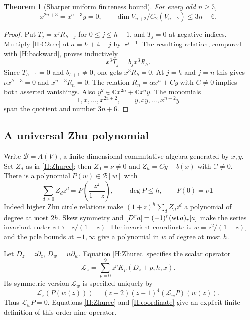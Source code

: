 \documentclass[11pt]{article}
\newtheorem{theorem}{Theorem}[section]
\newcommand{\C}{\mathbb C}\newcommand{\Q}{\mathbb Q}\newcommand{\Z}{\mathbb Z}
\newcommand{\one}{\mathbf1}\newcommand{\D}{\mathcal D}\newcommand{\Dcat}{\mathcal D}
\numberwithin{equation}{section}
\begin{document}
\begin{theorem}[Sharper uniform finiteness bound]\label{H:C2bound}
For every odd $n\geq3$,
\[
x^{2n+3}=x^{n+3}y=0,\qquad \dim V_{n+2}/C_2(V_{n+2})\leq3n+6.
\]
\end{theorem}
\begin{proof}
Put $T_j=x^jR_{h-j}$ for $0\leq j\leq h+1$, and $T_j=0$ at negative indices. Multiply \eqref{H:C2rec} at $a=h+4-j$ by $x^{j-1}$. The resulting relation, compared with \eqref{H:backward}, proves inductively
\[
x^3T_j=b_jx^3R_h.
\]
Since $T_{h+1}=0$ and $b_{h+1}\ne0$, one gets $x^3R_h=0$. At $j=h$ and $j=n$ this gives $\nu x^{h+3}=0$ and $x^{n+3}R_n=0$. The relation $R_n=\alpha x^n+Cy$ with $C\ne0$ implies both asserted vanishings. Also $y^2\in\C x^{2n}+\C x^ny$. The monomials
\[
1,x,\ldots,x^{2n+2},\qquad y,xy,\ldots,x^{n+2}y
\]
span the quotient and number $3n+6$.
\end{proof}

\subsection{A universal Zhu polynomial}
Write $\mathcal B=A(V)$, a finite-dimensional commutative algebra generated by $x,y$. Set $Z_d$ as in \eqref{H:Zhurec}; then $Z_0=\nu\ne0$ and $Z_h=Cy+b(x)$ with $C\ne0$. There is a polynomial $P(w)\in\mathcal B[w]$ with
\begin{equation}\label{H:P}
\sum_{d\geq0}Z_dz^d=P\!\left(\frac{z^2}{1+z}\right),\qquad
\deg P\leq h,\qquad P(0)=\nu\one.
\end{equation}
Indeed higher Zhu circle relations make $(1+z)^h\sum_dZ_dz^d$ a polynomial of degree at most $2h$. Skew symmetry and $[D^ra]=(-1)^r(\operatorname{wt} a)_r[a]$ make the series invariant under $z\mapsto-z/(1+z)$. The invariant coordinate is $w=z^2/(1+z)$, and the pole bounds at $-1,\infty$ give a polynomial in $w$ of degree at most $h$.

Let $D_z=z\partial_z$, $D_w=w\partial_w$. Equation \eqref{H:Zhurec} specifies the scalar operator
\begin{equation}\label{H:Lz}
\mathcal L_z=\sum_{p=0}^9z^pK_p(D_z+p,h,x).
\end{equation}
Its symmetric version $\mathcal L_w$ is specified uniquely by
\begin{equation}\label{H:coordinate}
\mathcal L_z(P(w(z)))=(z+2)(z+1)^4(\mathcal L_wP)(w(z)).
\end{equation}
Thus $\mathcal L_wP=0$. Equations \eqref{H:Zhurec} and \eqref{H:coordinate} give an explicit finite definition of this order-nine operator.
\end{document}

